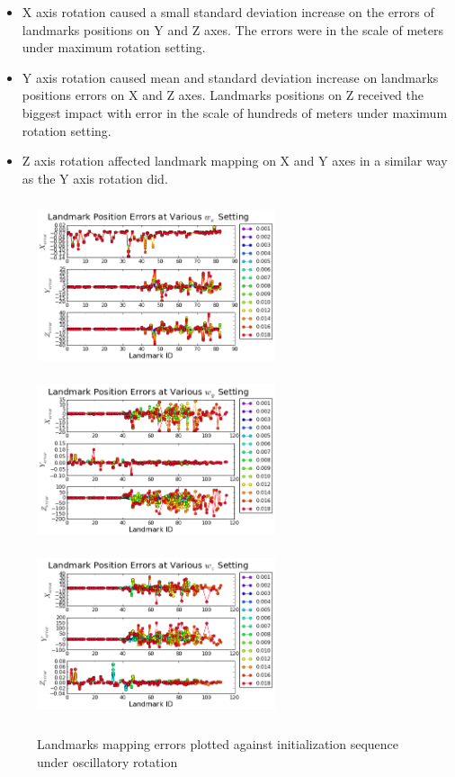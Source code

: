 \begin{itemize}
  \item X axis rotation caused a small standard deviation increase on
  the errors of landmarks positions on Y and Z axes. The errors were in the
  scale of meters under maximum rotation setting.
  \item Y axis rotation caused mean and standard deviation increase on
  landmarks positions errors on X and Z axes. Landmarks positions on Z
  received the biggest impact with error in the scale of hundreds of
  meters under maximum rotation setting.
  \item Z axis rotation affected landmark mapping on X and Y axes in a
  similar way as the Y axis rotation did.
\end{itemize}
\FloatBarrier
\begin{figure}[h]
  \centering
  \includegraphics[width=7cm, height=5cm]{./Figures/SimulationFigures/Figure17.png}
  \includegraphics[width=7cm, height=5cm]{./Figures/SimulationFigures/Figure18.png}
  \includegraphics[width=7cm, height=5cm]{./Figures/SimulationFigures/Figure19.png}
  \caption{Landmarks mapping errors plotted against initialization sequence under oscillatory rotation}
  \label{fig:simfig17-19}
\end{figure}

